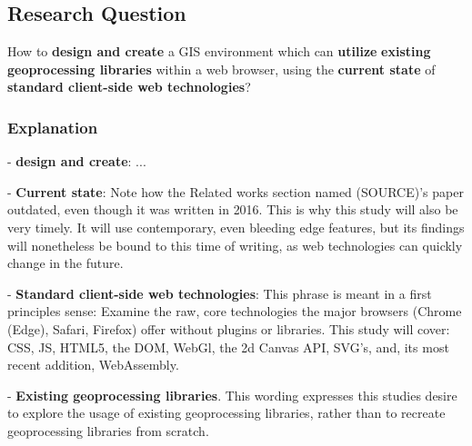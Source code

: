 

\subsection{Research Question}

How to \textbf{design and create} a GIS environment which can \textbf{utilize} \textbf{existing geoprocessing libraries} within a web browser, using the \textbf{current state} of \textbf{standard client-side web technologies}?


\subsubsection*{Explanation}


- \textbf{design and create}: ...

- \textbf{Current state}: Note how the Related works section named (SOURCE)'s paper outdated, even though it was written in 2016. This is why this study will also be very timely. It will use contemporary, even bleeding edge features, but its findings will nonetheless be bound to this time of writing, as web technologies can quickly change in the future. 

- \textbf{Standard client-side web technologies}: This phrase is meant in a first principles sense: Examine the raw, core technologies the major browsers (Chrome (Edge), Safari, Firefox) offer without plugins or libraries. This study will cover: CSS, JS, HTML5, the DOM, WebGl, the 2d Canvas API, SVG's, and, its most recent addition, WebAssembly. 

- \textbf{Existing geoprocessing libraries}. This wording expresses this studies desire to explore the usage of existing geoprocessing libraries, rather than to recreate geoprocessing libraries from scratch.

